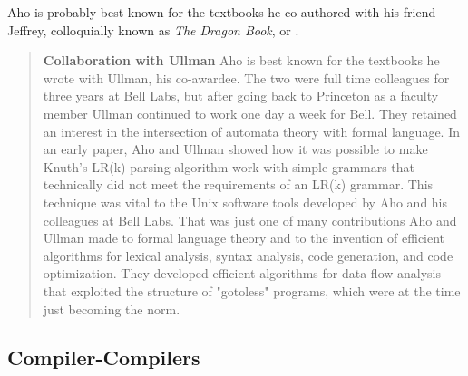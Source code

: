 Aho is probably best known for the textbooks he co-authored with his friend Jeffrey,
colloquially known as \textit{The Dragon Book}, or
\cite{the_dragon_book_aho_ullman_sethi_1986}.

\begin{quotation}
\textbf{Collaboration with Ullman}
Aho is best known for the textbooks he wrote with Ullman, his co-awardee. 
The two were full time colleagues for three years at Bell Labs, but after 
going back to Princeton as a faculty member Ullman continued to work one day a 
week for Bell. They retained an interest in the intersection of automata theory 
with formal language. In an early paper, Aho and Ullman showed how it was 
possible to make Knuth's LR(k) parsing algorithm work with simple grammars that 
technically did not meet the requirements of an LR(k) grammar. This technique 
was vital to the Unix software tools developed by Aho and his colleagues at Bell 
Labs. That was just one of many contributions Aho and Ullman made to formal 
language theory and to the invention of efficient algorithms for lexical 
analysis, syntax analysis, code generation, and code optimization. They 
developed efficient algorithms for data-flow analysis that exploited the 
structure of "gotoless" programs, which were at the time just becoming the norm.
\cite{aho_turing_award_2020}
\end{quotation}

\subsection{Compiler-Compilers}




